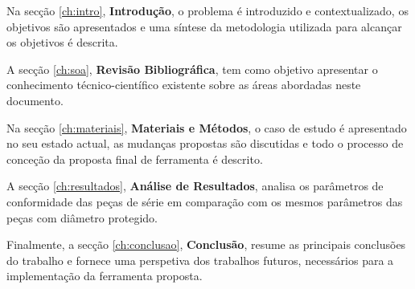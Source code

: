 Na secção \ref{ch:intro}, \textbf{Introdução}, o problema é introduzido e contextualizado, os objetivos são apresentados e uma síntese da metodologia utilizada para alcançar os objetivos é descrita.

A secção \ref{ch:soa}, \textbf{Revisão Bibliográfica}, tem como objetivo apresentar o conhecimento técnico-científico existente sobre as áreas abordadas neste documento.

Na secção \ref{ch:materiais}, \textbf{Materiais e Métodos}, o caso de estudo é apresentado no seu estado actual, as mudanças propostas são discutidas e todo o processo de conceção da proposta final de ferramenta é descrito.

A secção \ref{ch:resultados}, \textbf{Análise de Resultados}, analisa os parâmetros de conformidade das peças de série em comparação com os mesmos parâmetros das peças com diâmetro protegido.

Finalmente, a secção \ref{ch:conclusao}, \textbf{Conclusão}, resume as principais conclusões do trabalho e fornece uma perspetiva dos trabalhos futuros, necessários para a implementação da ferramenta proposta.
